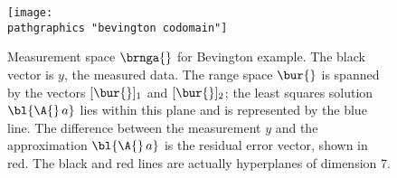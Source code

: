 \begin{figure}[t]
	\texttt{[image: \\pathgraphics "bevington codomain"]}
	\caption[Measurement space for Bevington example]{Measurement space $\brnga{}$ for Bevington example. The black vector is $y$, the measured data. The range space $\bur{}$ is spanned by the vectors $[\bur{}]_{1}$ and $[\bur{}]_{2}$; the least squares solution $\bl{\A{}\,a}$ lies within this plane and is represented by the blue line. The difference between the measurement $y$ and the approximation $\bl{\A{}\,a}$ is the residual error vector, shown in red. The black and red lines are actually hyperplanes of dimension 7.}
	\label{fig:bevington codomain}
\end{figure}

\endinput  %

